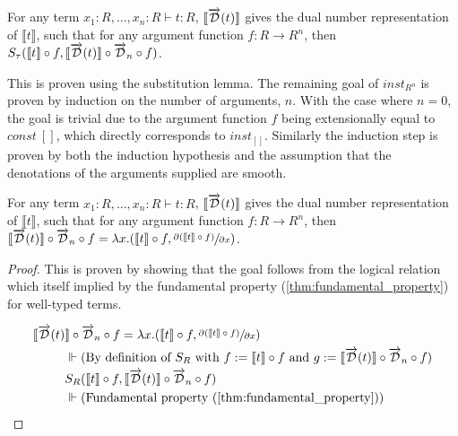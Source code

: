   \begin{lemma}\label{thm:fundamental_property}
    For any term $x_1 : R, ..., x_n : R \vdash t : R$, $\llbracket\overrightarrow{\mathcal{D}}(t)\rrbracket$ gives the dual number representation of $\llbracket t \rrbracket$, such that for any argument function $f : R \rightarrow R^n$, then $S_\tau(\llbracket t\rrbracket \circ f, \llbracket \overrightarrow{\mathcal{D}}(t)\rrbracket \circ \overrightarrow{\mathcal{D}}_n \circ f)$.
  \end{lemma}

  This is proven using the substitution lemma.
  The remaining goal of $inst_{R^n}$ is proven by induction on the number of arguments, $n$.
  With the case where $n = 0$, the goal is trivial due to the argument function $f$ being extensionally equal to $const\ []$, which directly corresponds to $inst_{[]}$.
  Similarly the induction step is proven by both the induction hypothesis and the assumption that the denotations of the arguments supplied are smooth.

  \begin{theorem}
    For any term $x_1 : R, ..., x_n : R \vdash t : R$, $\llbracket\overrightarrow{\mathcal{D}}(t)\rrbracket$ gives the dual number representation of $\llbracket t \rrbracket$, such that for any argument function $f : R \rightarrow R^n$, then $\llbracket \overrightarrow{\mathcal{D}}(t) \rrbracket \circ \overrightarrow{\mathcal{D}}_n \circ f = \lambda x. (\llbracket t \rrbracket \circ f, \sfrac{\partial{(\llbracket t \rrbracket \circ f)}}{\partial{x}})$.
  \end{theorem}

  \begin{proof}
    This is proven by showing that the goal follows from the logical relation which itself implied by the fundamental property (\ref{thm:fundamental_property}) for well-typed terms.

    \begin{align*}
      \llbracket \overrightarrow{\mathcal{D}}(t) &\rrbracket \circ \overrightarrow{\mathcal{D}}_n \circ f = \lambda x. (\llbracket t \rrbracket \circ f, \sfrac{\partial{(\llbracket t \rrbracket \circ f)}}{\partial{x}}) \\
      & \Vdash \text{(By definition of $S_R$ with $f := \llbracket t \rrbracket \circ f$ and $g := \llbracket \overrightarrow{\mathcal{D}}(t) \rrbracket \circ \overrightarrow{\mathcal{D}}_n \circ f$)} \\
      & S_R(\llbracket t \rrbracket \circ f, \llbracket \overrightarrow{\mathcal{D}}(t) \rrbracket \circ \overrightarrow{\mathcal{D}}_n \circ f) \\
      & \Vdash \text{(Fundamental property (\ref{thm:fundamental_property}))}
    \end{align*}
  \end{proof}
